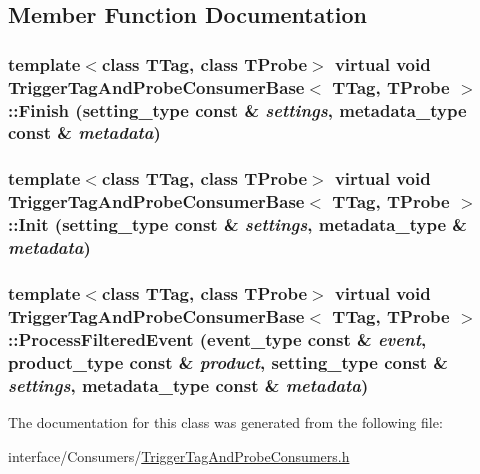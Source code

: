 \subsection{Member Function Documentation}
\hypertarget{classTriggerTagAndProbeConsumerBase_a1d02e67983d6b0373cbbd22d30aeb155}{
\subsubsection[{Finish}]{\setlength{\rightskip}{0pt plus 5cm}template$<$class TTag, class TProbe$>$ virtual void {\bf TriggerTagAndProbeConsumerBase}$<$ TTag, TProbe $>$::Finish (setting\_\-type const \& {\em settings}, \/  metadata\_\-type const \& {\em metadata})}}
\label{classTriggerTagAndProbeConsumerBase_a1d02e67983d6b0373cbbd22d30aeb155}
\hypertarget{classTriggerTagAndProbeConsumerBase_acec908ee45e6f569a37813374994fc16}{
\subsubsection[{Init}]{\setlength{\rightskip}{0pt plus 5cm}template$<$class TTag, class TProbe$>$ virtual void {\bf TriggerTagAndProbeConsumerBase}$<$ TTag, TProbe $>$::Init (setting\_\-type const \& {\em settings}, \/  metadata\_\-type \& {\em metadata})}}
\label{classTriggerTagAndProbeConsumerBase_acec908ee45e6f569a37813374994fc16}
\hypertarget{classTriggerTagAndProbeConsumerBase_af30e0162b257606deea2c0614de9de06}{
\subsubsection[{ProcessFilteredEvent}]{\setlength{\rightskip}{0pt plus 5cm}template$<$class TTag, class TProbe$>$ virtual void {\bf TriggerTagAndProbeConsumerBase}$<$ TTag, TProbe $>$::ProcessFilteredEvent (event\_\-type const \& {\em event}, \/  product\_\-type const \& {\em product}, \/  setting\_\-type const \& {\em settings}, \/  metadata\_\-type const \& {\em metadata})}}
\label{classTriggerTagAndProbeConsumerBase_af30e0162b257606deea2c0614de9de06}


The documentation for this class was generated from the following file:\begin{DoxyCompactItemize}
\item 
interface/Consumers/\hyperlink{TriggerTagAndProbeConsumers_8h}{TriggerTagAndProbeConsumers.h}\end{DoxyCompactItemize}
